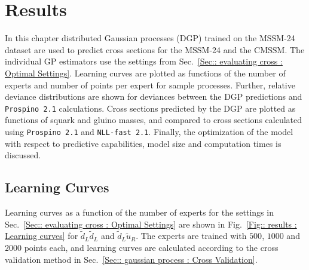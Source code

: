 \documentclass[twoside,english]{uiofysmaster}
\begin{document}
{{\chapter{Results}\label{Chapter:Results}

In this chapter distributed Gaussian processes (DGP) trained on the MSSM-24 dataset are used to predict cross sections for the MSSM-24 and the CMSSM. The individual GP estimators use the settings from Sec.~\ref{Sec:: evaluating cross : Optimal Settings}. Learning curves are plotted as functions of the number of experts and number of points per expert for sample processes. Further, relative deviance distributions are shown for deviances between the DGP predictions and \verb|Prospino 2.1| calculations. Cross sections predicted by the DGP are plotted as functions of squark and gluino masses, and compared to cross sections calculated using \verb|Prospino 2.1| and \verb|NLL-fast 2.1|. Finally, the optimization of the model with respect to predictive capabilities, model size and computation times is discussed.

\section{Learning Curves}

Learning curves as a function of the number of experts for the settings in Sec.~\ref{Sec:: evaluating cross : Optimal Settings} are shown in Fig.~\ref{Fig:: results : Learning curves} for $\widetilde{d}_L \widetilde{d}_L$ and $\widetilde{d}_L \widetilde{u}_R$. The experts are trained with $500$, $1000$ and $2000$ points each, and learning curves are calculated according to the cross validation method in Sec.~\ref{Sec:: gaussian process : Cross Validation}.

}}
\end{document}
